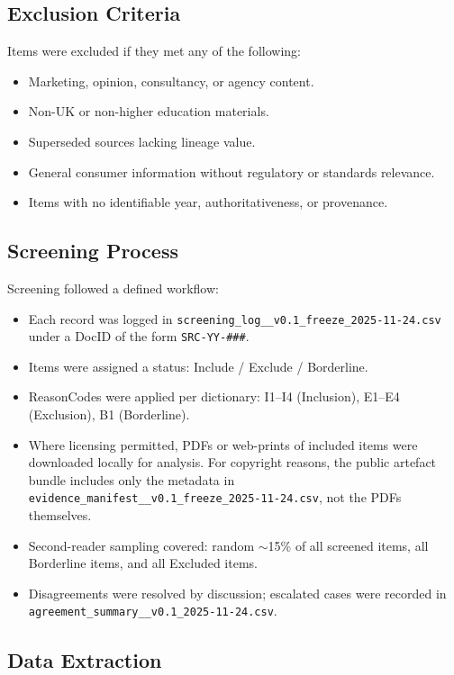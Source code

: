 \subsection{Exclusion Criteria}

Items were excluded if they met any of the following:

\begin{itemize}
    \item Marketing, opinion, consultancy, or agency content.
    \item Non-UK or non-higher education materials.
    \item Superseded sources lacking lineage value.
    \item General consumer information without regulatory or standards relevance.
    \item Items with no identifiable year, authoritativeness, or provenance.
\end{itemize}

\subsection{Screening Process}

Screening followed a defined workflow:

\begin{itemize}
    \item Each record was logged in \texttt{screening\_log\_\_v0.1\_freeze\_2025-11-24.csv} under a DocID of the form \texttt{SRC-YY-\#\#\#}.
    \item Items were assigned a status: Include / Exclude / Borderline.
    \item ReasonCodes were applied per dictionary: I1--I4 (Inclusion), E1--E4 (Exclusion), B1 (Borderline).
    \item Where licensing permitted, PDFs or web-prints of included items were downloaded locally for analysis. For copyright reasons, the public artefact bundle includes only the metadata in \texttt{evidence\_manifest\_\_v0.1\_freeze\_2025-11-24.csv}, not the PDFs themselves.
    \item Second-reader sampling covered: random $\sim$15\% of all screened items, all Borderline items, and all Excluded items.
    \item \raggedright Disagreements were resolved by discussion; escalated cases were recorded in \texttt{agreement\_summary\_\_v0.1\_2025-11-24.csv}.
\end{itemize}

\subsection{Data Extraction}


